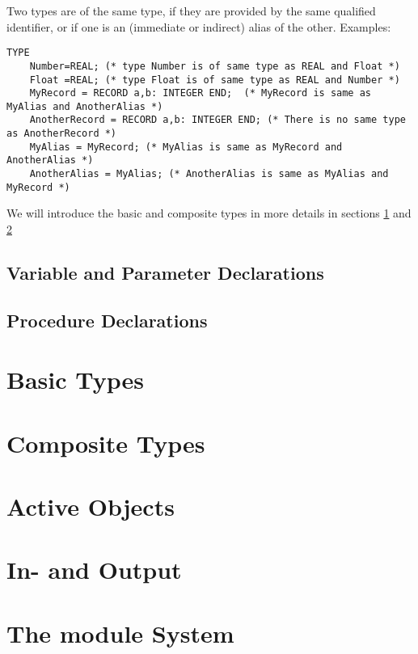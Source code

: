 \documentclass[a4paper,11pt]{article}
\begin{document}
Two types are of the same type, if they are provided by the same qualified identifier, or if one is an (immediate or indirect) alias of the other. Examples: 
\begin{lstlisting}[language=Oberon,frame=none,caption={Same and different types}]
TYPE 
    Number=REAL; (* type Number is of same type as REAL and Float *) 
    Float =REAL; (* type Float is of same type as REAL and Number *) 
    MyRecord = RECORD a,b: INTEGER END;  (* MyRecord is same as MyAlias and AnotherAlias *) 
    AnotherRecord = RECORD a,b: INTEGER END; (* There is no same type as AnotherRecord *) 
    MyAlias = MyRecord; (* MyAlias is same as MyRecord and AnotherAlias *) 
    AnotherAlias = MyAlias; (* AnotherAlias is same as MyAlias and MyRecord *)
\end{lstlisting}

We will introduce the basic and composite types in more details in sections \ref{section:BasicTypes} and \ref{section:CompositeTypes}

\subsection{Variable and Parameter Declarations}

\subsection{Procedure Declarations}

\section{Basic Types}\label{section:BasicTypes}

\section{Composite Types}\label{section:CompositeTypes}

\section{Active Objects}

\section{In- and Output}

\section{The module System}
\end{document}
